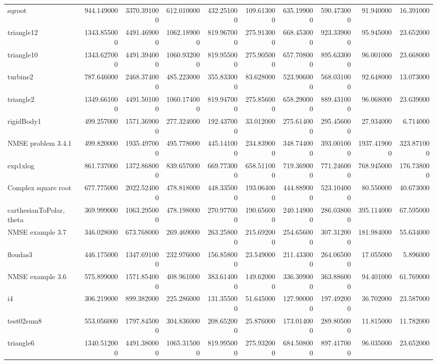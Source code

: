 \begin{longtable}{lrrrrrrrrr}
sqroot & 944.149000 & 3370.391000 & 612.010000 & 432.251000 & 109.613000 & 635.199000 & 590.473000 & 91.940000 & 16.391000 \\
triangle12 & 1343.855000 & 4491.469000 & 1062.189000 & 819.967000 & 275.913000 & 668.453000 & 923.339000 & 95.945000 & 23.652000 \\
triangle10 & 1343.627000 & 4491.394000 & 1060.932000 & 819.955000 & 275.905000 & 657.708000 & 895.633000 & 96.001000 & 23.668000 \\
turbine2 & 787.646000 & 2468.374000 & 485.223000 & 355.833000 & 83.628000 & 523.906000 & 568.031000 & 92.648000 & 13.073000 \\
triangle2 & 1349.661000 & 4491.501000 & 1060.174000 & 819.947000 & 275.856000 & 658.290000 & 889.431000 & 96.068000 & 23.639000 \\
rigidBody1 & 499.257000 & 1571.369000 & 277.324000 & 192.437000 & 33.012000 & 275.614000 & 295.456000 & 27.934000 & 6.714000 \\
NMSE problem 3.4.1 & 499.820000 & 1935.497000 & 495.778000 & 445.141000 & 234.839000 & 348.744000 & 393.001000 & 1937.419000 & 323.871000 \\
exp1xlog & 861.737000 & 1372.868000 & 839.657000 & 669.773000 & 658.511000 & 719.369000 & 771.246000 & 768.945000 & 176.738000 \\
Complex square root & 677.775000 & 2022.524000 & 478.818000 & 448.335000 & 193.064000 & 444.889000 & 523.104000 & 80.550000 & 40.673000 \\
carthesianToPolar, theta & 369.999000 & 1063.295000 & 478.198000 & 270.977000 & 190.656000 & 240.149000 & 286.038000 & 395.114000 & 67.595000 \\
NMSE example 3.7 & 346.028000 & 673.768000 & 269.469000 & 263.258000 & 215.692000 & 254.656000 & 307.312000 & 181.984000 & 55.634000 \\
floudas3 & 446.175000 & 1347.691000 & 232.976000 & 156.858000 & 23.549000 & 211.433000 & 264.065000 & 17.055000 & 5.896000 \\
NMSE example 3.6 & 575.899000 & 1571.854000 & 408.961000 & 383.614000 & 149.620000 & 336.309000 & 363.886000 & 94.401000 & 61.769000 \\
i4 & 306.219000 & 899.382000 & 225.286000 & 131.355000 & 51.645000 & 127.900000 & 197.492000 & 36.702000 & 23.587000 \\
test02sum8 & 553.056000 & 1797.845000 & 304.836000 & 208.652000 & 25.876000 & 173.014000 & 289.805000 & 11.815000 & 11.782000 \\
triangle6 & 1340.512000 & 4491.380000 & 1065.315000 & 819.995000 & 275.932000 & 684.508000 & 897.417000 & 96.035000 & 23.652000 \\

\end{longtable}
